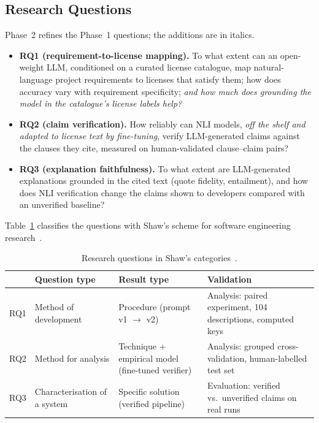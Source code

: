 \subsection{Research Questions}
Phase~2 refines the Phase~1 questions; the additions are in italics.
\begin{itemize}
    \item \textbf{RQ1 (requirement-to-license mapping).} To what extent can an open-weight LLM, conditioned on a curated license catalogue, map natural-language project requirements to licenses that satisfy them; how does accuracy vary with requirement specificity; \emph{and how much does grounding the model in the catalogue's license labels help?}
    \item \textbf{RQ2 (claim verification).} How reliably can NLI models, \emph{off the shelf and adapted to license text by fine-tuning}, verify LLM-generated claims against the clauses they cite, measured on human-validated clause--claim pairs?
    \item \textbf{RQ3 (explanation faithfulness).} To what extent are LLM-generated explanations grounded in the cited text (quote fidelity, entailment), and how does NLI verification change the claims shown to developers compared with an unverified baseline?
\end{itemize}

Table~\ref{tab:shaw} classifies the questions with Shaw's scheme for software engineering research~\cite{shaw2003writing}.

\begin{table}[tb]
    \caption{Research questions in Shaw's categories~\cite{shaw2003writing}.}
    \label{tab:shaw}
    \centering
    \footnotesize
    \begin{tabularx}{\columnwidth}{@{}l>{\raggedright\arraybackslash}X>{\raggedright\arraybackslash}X>{\raggedright\arraybackslash}X@{}}
        \toprule
        & \textbf{Question type} & \textbf{Result type} & \textbf{Validation} \\
        \midrule
        RQ1 & Method of development & Procedure (prompt v1 $\rightarrow$ v2) & Analysis: paired experiment, 104 descriptions, computed keys \\
        RQ2 & Method for analysis & Technique + empirical model (fine-tuned verifier) & Analysis: grouped cross-validation, human-labelled test set \\
        RQ3 & Characterisation of a system & Specific solution (verified pipeline) & Evaluation: verified vs.\ unverified claims on real runs \\
        \bottomrule
    \end{tabularx}
\end{table}

